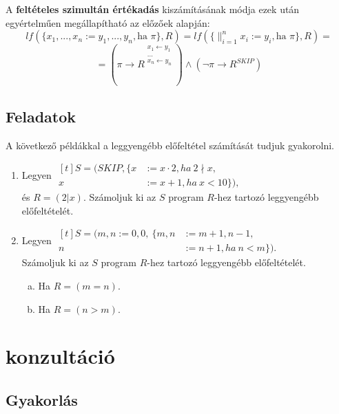 \documentclass[12pt]{article}
\begin{document}
	A \textbf{feltételes szimultán értékadás} kiszámításának módja ezek után egyértelműen megállapítható az előzőek alapján:
	$$lf(\{x_1, ..., x_n := y_1, ..., y_n, \text{ha } \pi \}, R) = lf(\{ \mathop{\parallel}_{i=1}^{n} x_i := y_i, \text{ha }\pi \}, R) = $$
	$$= (\pi \rightarrow R^{\substack{ x_1 \leftarrow y_1 \\ ... \\ x_n \leftarrow y_n }}) \land (\neg \pi \rightarrow R^{SKIP})$$
	
	\subsection{Feladatok}\label{lf-feladat}
	A következő példákkal a leggyengébb előfeltétel számítását tudjuk gyakorolni.
	
	\begin{enumerate}
		\item Legyen $\begin{aligned}[t]
		S = (SKIP, \{x &:= x \cdot 2, ha\ 2 \nmid x,\\
		x &:= x + 1, ha\ x < 10\}),
		\end{aligned}$\\
		és $R = (2 | x)$. Számoljuk ki az $S$ program $R$-hez tartozó leggyengébb előfeltételét.
		\item Legyen $\begin{aligned}[t]
		S = (m,n := 0,0,\ \{m,n &:= m+1, n-1,\\
		n &:= n + 1, ha\ n < m\}).
		\end{aligned}$\\
		Számoljuk ki az $S$ program $R$-hez tartozó leggyengébb előfeltételét.
		\begin{enumerate}[a)]
			\item Ha $R = (m = n).$
			\item Ha $R = (n > m).$
		\end{enumerate}
	\end{enumerate}
	
	
	\section{konzultáció}
	\subsection{Gyakorlás}
\end{document}
